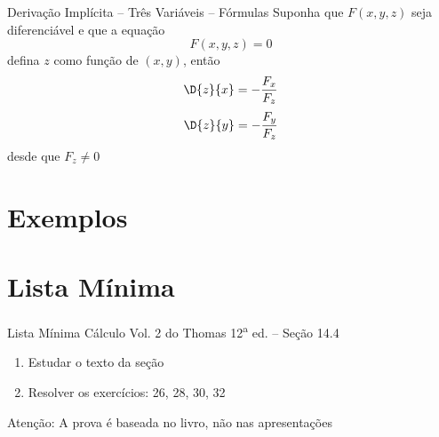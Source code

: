 \documentclass[fleqn,utf8,aspectratio=169,12pt,ignorenonframetext]{beamer}
\begin{document}
\begin{frame}{Derivação Implícita -- Três Variáveis -- Fórmulas}
  Suponha que $F(x, y, z)$ seja diferenciável e que a equação
  \[
    F(x, y, z) = 0
  \]
  defina $z$ como função de $(x, y)$, então
  \[
    \D{z}{x} = -\frac{F_x}{F_z}
  \]
  \[
    \D{z}{y} = -\frac{F_y}{F_z}
  \]
  desde que \(F_z \neq 0\)
\end{frame}



\section{Exemplos}




\section{Lista Mínima}

\begin{frame}{Lista Mínima}
  Cálculo Vol. 2 do Thomas 12\textsuperscript{a} ed. -- Seção 14.4
  \begin{enumerate}
    \item Estudar o texto da seção
    \item Resolver os exercícios: 26, 28, 30, 32
  \end{enumerate}

  \vfill
  Atenção: A prova é baseada no livro, não nas apresentações
\end{frame}

\end{document}
